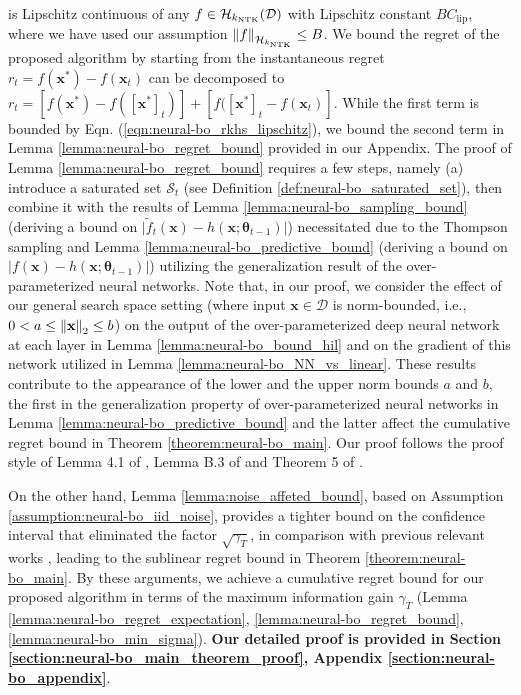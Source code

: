 is Lipschitz continuous of any $f \in \mathcal{H}_{k_\textup{NTK}}(\mathcal{D})$ with Lipschitz constant $B C_{\text{lip}}$, where we have used our assumption $\norm{f}_{\mathcal{H}_{k_\textup{NTK}}} \leq B$. We bound the regret of the proposed algorithm by starting from the instantaneous regret $r_t = f(\mathbf{x}^*) - f(\mathbf{x}_t)$ can be decomposed to $r_t = [f(\mathbf{x}^*) - f([\mathbf{x}^*]_t)] + [f([\mathbf{x}^*]_t - f(\mathbf{x}_t)]$. While the first term is bounded by Eqn. (\ref{eqn:neural-bo_rkhs_lipschitz}),  we bound the second term in Lemma \ref{lemma:neural-bo_regret_bound} provided in our Appendix. The proof of Lemma \ref{lemma:neural-bo_regret_bound} requires a few steps, namely (a) introduce a saturated set $\mathcal S_t$ (see Definition \ref{def:neural-bo_saturated_set}), then combine it with the results of Lemma \ref{lemma:neural-bo_sampling_bound} (deriving a bound on $\lvert \widetilde{f}_t(\mathbf{x}) - h(\mathbf{x}; \boldsymbol{\theta}_{t-1}) \rvert$) necessitated due to the Thompson sampling and Lemma \ref{lemma:neural-bo_predictive_bound} (deriving a bound on $\lvert f(\mathbf{x}) - h(\mathbf{x}; \boldsymbol{\theta}_{t-1}) \rvert$) utilizing the generalization result of the over-parameterized neural networks. Note that, in our proof, we consider the effect of our general search space setting (where input $\mathbf{x} \in \mathcal{D}$ is norm-bounded, i.e.,  $0 < a \le \norm{\mathbf{x}}_2 \le b$) on the output of the over-parameterized deep neural network at each layer in Lemma \ref{lemma:neural-bo_bound_hil} and on the gradient of this network utilized in Lemma \ref{lemma:neural-bo_NN_vs_linear}. These results contribute to the appearance of the lower and the upper norm bounds $a$ and $b$, the first in the generalization property of over-parameterized neural networks in Lemma \ref{lemma:neural-bo_predictive_bound} and the latter affect the cumulative regret bound in Theorem \ref{theorem:neural-bo_main}. Our proof follows the proof style of Lemma 4.1 of \citet{cao2019generalization}, Lemma B.3 of \citet{cao2019generalization} and Theorem 5 
of \citet{allen2019convergence}. 

On the other hand, Lemma \ref{lemma:noise_affeted_bound}, based on Assumption \ref{assumption:neural-bo_iid_noise}, provides a tighter bound on the confidence interval that eliminated the factor $\sqrt{\gamma_T}$, in comparison with previous relevant works \citet{chowdhury2017kernelized, zhou2020neural}, leading to the sublinear regret bound in Theorem \ref{theorem:neural-bo_main}.   
By these arguments, we achieve a cumulative regret bound for our proposed algorithm in terms of the maximum information gain $\gamma_T$ (Lemma \ref{lemma:neural-bo_regret_expectation}, \ref{lemma:neural-bo_regret_bound}, \ref{lemma:neural-bo_min_sigma}). \textbf{Our detailed proof is provided in Section \ref{section:neural-bo_main_theorem_proof}, Appendix \ref{section:neural-bo_appendix}}.

